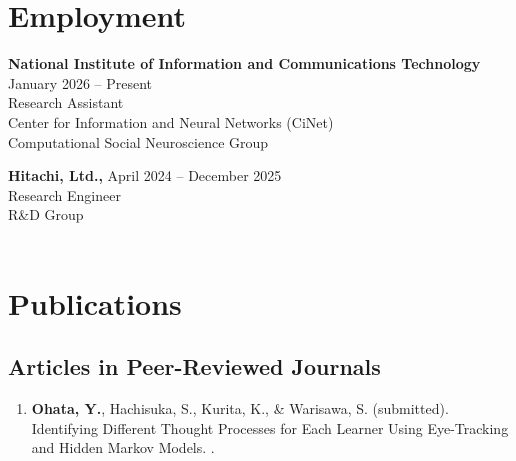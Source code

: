 \documentclass[letterpaper,10.5pt]{article}
\begin{document}
\section*{Employment}
\textbf{National Institute of Information and Communications Technology} \hfill January 2026 -- Present \\
Research Assistant \\
Center for Information and Neural Networks (CiNet) \\
Computational Social Neuroscience Group \\
\par\vspace{3pt}
\textbf{Hitachi, Ltd.,} \hfill April 2024 -- December 2025 \\
Research Engineer \\
R\&D Group \\
 \\
\par\vspace{3pt}
\section*{Publications}
\subsection*{Articles in Peer-Reviewed Journals}
\begin{enumerate}[label=\textbf{J\arabic*}, leftmargin=35pt]
  \item \textbf{Ohata, Y.}, Hachisuka, S., Kurita, K., \& Warisawa, S. (submitted). Identifying Different Thought Processes for Each Learner Using Eye-Tracking and Hidden Markov Models. \textit{}.
\end{enumerate}\vspace{2pt}
\end{document}
